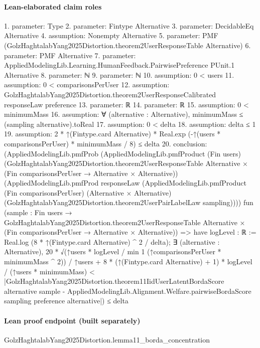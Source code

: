 \documentclass[10pt]{article}
\begin{document}
\paragraph{Lean-elaborated claim roles}\begin{ReviewVerbatim}
1. parameter: Type
2. parameter: Fintype Alternative
3. parameter: DecidableEq Alternative
4. assumption: Nonempty Alternative
5. parameter: PMF (GolzHaghtalabYang2025Distortion.theorem2UserResponseTable Alternative)
6. parameter: PMF Alternative
7. parameter: AppliedModelingLib.Learning.HumanFeedback.PairwisePreference PUnit.{1} Alternative
8. parameter: ℕ
9. parameter: ℕ
10. assumption: 0 < users
11. assumption: 0 < comparisonsPerUser
12. assumption: GolzHaghtalabYang2025Distortion.theorem2UserResponseCalibrated responseLaw preference
13. parameter: ℝ
14. parameter: ℝ
15. assumption: 0 < minimumMass
16. assumption: ∀ (alternative : Alternative), minimumMass ≤ (sampling alternative).toReal
17. assumption: 0 < delta
18. assumption: delta ≤ 1
19. assumption: 2 * ↑(Fintype.card Alternative) * Real.exp (-↑(users * comparisonsPerUser) * minimumMass / 8) ≤ delta
20. conclusion: (AppliedModelingLib.pmfProb
    (AppliedModelingLib.pmfProduct (Fin users)
      (GolzHaghtalabYang2025Distortion.theorem2UserResponseTable Alternative ×
        (Fin comparisonsPerUser → Alternative × Alternative))
      (AppliedModelingLib.pmfProd responseLaw
        (AppliedModelingLib.pmfProduct (Fin comparisonsPerUser) (Alternative × Alternative)
          (GolzHaghtalabYang2025Distortion.theorem2UserPairLabelLaw sampling))))
    fun
      (sample :
        Fin users →
          GolzHaghtalabYang2025Distortion.theorem2UserResponseTable Alternative ×
            (Fin comparisonsPerUser → Alternative × Alternative)) =>
    have logLevel : ℝ := Real.log (8 * ↑(Fintype.card Alternative) ^ 2 / delta);
    ∃ (alternative : Alternative),
      20 * √(↑users * logLevel / min 1 (↑comparisonsPerUser * minimumMass ^ 2)) / ↑users +
          8 * (↑(Fintype.card Alternative) + 1) * logLevel / (↑users * minimumMass) <
        |GolzHaghtalabYang2025Distortion.theorem11IidUserLatentBordaScore alternative sample -
            AppliedModelingLib.Alignment.Welfare.pairwiseBordaScore sampling preference alternative|) ≤
  delta
\end{ReviewVerbatim}

\paragraph{Lean proof endpoint (built separately)}\begin{ReviewVerbatim}
GolzHaghtalabYang2025Distortion.lemma11_borda_concentration
\end{ReviewVerbatim}
\end{document}

